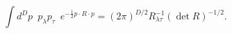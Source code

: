 \begin{equation}\label{dpp2}
    \int d^Dp\,\,\,
        p_{\lambda}p_{\tau}\,\,\,
        e^{-\frac{1}{2}p\cdot R\cdot p}
        =(2\pi)^{D/2}R^{-1}_{{\lambda}{\tau}}(\det R)^{-1/2}.
\end{equation}

